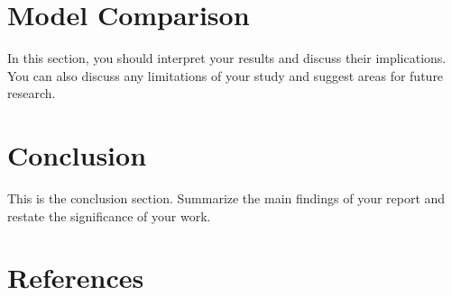 \documentclass[12pt]{article}
\begin{document}
\section{Model Comparison}
In this section, you should interpret your results and discuss their implications. You can also discuss any limitations of your study and suggest areas for future research.

\section{Conclusion}
This is the conclusion section. Summarize the main findings of your report and restate the significance of your work.

\section{References}


\end{document}
